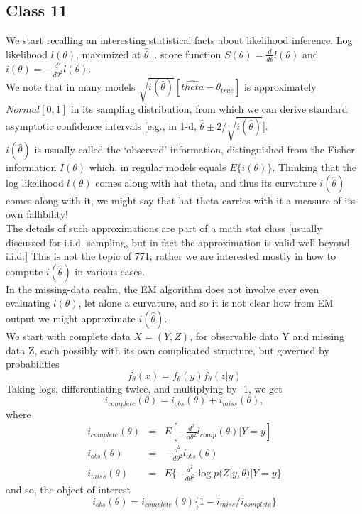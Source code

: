 \documentclass[11pt,a4paper]{article}
\begin{document}
\subsection*{Class 11}
We start recalling an interesting statistical facts about likelihood inference.   Log likelihood $l(\theta)$, maximized at $\hat{\theta}$... score function $S(\theta) = \frac{d}{d\theta} l(\theta)$ and $i(\theta) = - \frac{d^2}{d\theta^2} l(\theta)$.\\
We note that in many models   $\sqrt{i(\hat{\theta})} [\hat{theta} - \theta_{true} ]$  is approximately $Normal[0,1]$ in its sampling distribution, from which we can derive standard asymptotic confidence intervals [e.g., in 1-d,  $\hat{\theta} \pm 2/\sqrt{i(\hat{ \theta})}$].\\
$i(\hat{\theta})$ is usually called the `observed' information, distinguished from the Fisher information $ I(\theta)$ which, in regular models equals $E\{ i(\theta) \}$.   
Thinking that the log likelihood $l(\theta)$ comes along with hat theta, and thus its curvature $i(\hat{\theta})$ comes along with it, we might say that hat theta carries with it a measure of its own fallibility!\\
The details of such approximations are part of a math stat class [usually discussed for i.i.d. sampling, but in fact the approximation is valid well beyond i.i.d.]  This is not the topic of 771; rather we are interested mostly in how to compute $i(\hat{\theta})$ in various cases.\\
In the missing-data realm, the EM algorithm does not involve ever even evaluating $l(\theta)$, let alone a curvature, and so it is not clear how from EM output we might approximate $i( \hat{\theta} )$.\\
We start with complete data $X = (Y,Z)$, for observable data Y and missing data Z, each possibly with its own complicated structure, but governed by probabilities
$$f_\theta (x) = f_\theta (y)  f_\theta( z | y) $$
Taking logs, differentiating twice, and multiplying by -1, we get
$$i_{complete}( \theta ) = i_{obs}(\theta) + i_{miss}(\theta),$$
where 
\begin{eqnarray*}
i_{complete} (\theta ) &=& E[- \frac{d^2}{d\theta^2}  l_{comp}(\theta) | Y=y ]\\
i_{obs}(\theta) &=& - \frac{d^2}{d\theta^2}  l_{obs}(\theta)\\
i_{miss}(\theta) &=& E\{-\frac{d^2}{d\theta^2} \log p(Z | y, \theta) | Y=y \}
\end{eqnarray*}
and so, the object of interest 
$$i_{obs}(\theta) = i_{complete}(\theta) \{  1 - i_{miss}/i_{complete} \}$$
\end{document}
